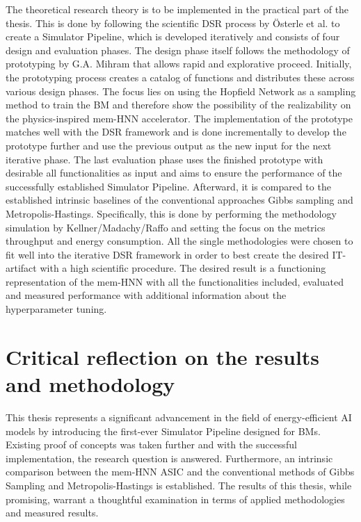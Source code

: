 The theoretical research theory is to be implemented in the practical part of the thesis.
This is done by following the scientific \ac{DSR} process by Österle et al. to create a Simulator Pipeline,
which is developed iteratively and consists of four design and evaluation phases. 
The design phase itself follows the methodology of prototyping by G.A. Mihram that allows rapid and explorative proceed.
Initially, the prototyping process creates a catalog of functions and distributes these across various design phases.
The focus lies on using the Hopfield Network as a sampling method to train the \ac{BM}
and therefore show the possibility of the realizability on the physics-inspired \ac{mem-HNN} accelerator.
The implementation of the prototype matches well with the \ac{DSR} framework and is done incrementally to develop the prototype further and use the previous output as
the new input for the next iterative phase.   
The last evaluation phase uses the finished prototype with desirable all functionalities as input and 
aims to ensure the performance of the successfully established Simulator Pipeline. 
Afterward, it is compared to the established intrinsic baselines
of the conventional approaches Gibbs sampling and Metropolis-Hastings.
Specifically, this is done by performing the methodology simulation by Kellner/Madachy/Raffo and setting the focus on 
the metrics throughput and energy consumption. 
All the single methodologies were chosen to fit well into the iterative \ac{DSR} framework in order to best 
create the desired \ac{IT}-artifact with a high scientific procedure.
The desired result is a functioning representation of the \ac{mem-HNN} with all the functionalities included, 
evaluated and measured performance with additional information about the hyperparameter tuning.

\section{Critical reflection on the results and methodology}

This thesis represents a significant advancement in the field of energy-efficient AI models by introducing the first-ever Simulator Pipeline designed for \ac{BM}s.
Existing proof of concepts was taken further and with the successful implementation, the research question is answered.
Furthermore, an intrinsic comparison between the \ac{mem-HNN} \ac{ASIC} and the conventional methods of Gibbs Sampling and Metropolis-Hastings is established.
The results of this thesis, while promising, warrant a thoughtful examination in terms of applied methodologies and measured results.

